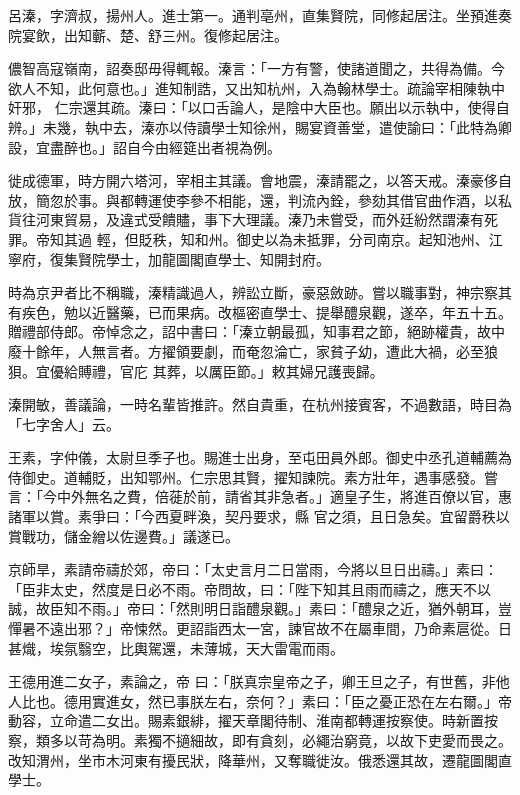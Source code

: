 \begin{pinyinscope}
 呂溱，字濟叔，揚州人。進士第一。通判亳州，直集賢院，同修起居注。坐預進奏院宴飲，出知蘄、楚、舒三州。復修起居注。



 儂智高寇嶺南，詔奏邸毋得輒報。溱言：「一方有警，使諸道聞之，共得為備。今欲人不知，此何意也。」進知制誥，又出知杭州，入為翰林學士。疏論宰相陳執中奸邪，
 仁宗還其疏。溱曰：「以口舌論人，是陰中大臣也。願出以示執中，使得自辨。」未幾，執中去，溱亦以侍讀學士知徐州，賜宴資善堂，遣使諭曰：「此特為卿設，宜盡醉也。」詔自今由經筵出者視為例。



 徙成德軍，時方開六塔河，宰相主其議。會地震，溱請罷之，以答天戒。溱豪侈自放，簡忽於事。與都轉運使李參不相能，還，判流內銓，參劾其借官曲作酒，以私貨往河東貿易，及違式受饋贐，事下大理議。溱乃未嘗受，而外廷紛然謂溱有死罪。帝知其過
 輕，但貶秩，知和州。御史以為未抵罪，分司南京。起知池州、江寧府，復集賢院學士，加龍圖閣直學士、知開封府。



 時為京尹者比不稱職，溱精識過人，辨訟立斷，豪惡斂跡。嘗以職事對，神宗察其有疾色，勉以近醫藥，已而果病。改樞密直學士、提舉醴泉觀，遂卒，年五十五。贈禮部侍郎。帝悼念之，詔中書曰：「溱立朝最孤，知事君之節，絕跡權貴，故中廢十餘年，人無言者。方擢領要劇，而奄忽淪亡，家貧子幼，遭此大禍，必至狼狽。宜優給賻禮，官庀
 其葬，以厲臣節。」敕其婦兄護喪歸。



 溱開敏，善議論，一時名輩皆推許。然自貴重，在杭州接賓客，不過數語，時目為「七字舍人」云。



 王素，字仲儀，太尉旦季子也。賜進士出身，至屯田員外郎。御史中丞孔道輔薦為侍御史。道輔貶，出知鄂州。仁宗思其賢，擢知諫院。素方壯年，遇事感發。嘗言：「今中外無名之費，倍蓰於前，請省其非急者。」適皇子生，將進百僚以官，惠諸軍以賞。素爭曰：「今西夏畔渙，契丹要求，縣
 官之須，且日急矣。宜留爵秩以賞戰功，儲金繒以佐邊費。」議遂已。



 京師旱，素請帝禱於郊，帝曰：「太史言月二日當雨，今將以旦日出禱。」素曰：「臣非太史，然度是日必不雨。帝問故，曰：「陛下知其且雨而禱之，應天不以誠，故臣知不雨。」帝曰：「然則明日詣醴泉觀。」素曰：「醴泉之近，猶外朝耳，豈憚暑不遠出邪？」帝悚然。更詔詣西太一宮，諫官故不在屬車間，乃命素扈從。日甚熾，埃氛翳空，比輿駕還，未薄城，天大雷電而雨。



 王德用進二女子，素論之，帝
 曰：「朕真宗皇帝之子，卿王旦之子，有世舊，非他人比也。德用實進女，然已事朕左右，奈何？」素曰：「臣之憂正恐在左右爾。」帝動容，立命遣二女出。賜素銀緋，擢天章閣待制、淮南都轉運按察使。時新置按察，類多以苛為明。素獨不擿細故，即有貪刻，必繩治窮竟，以故下吏愛而畏之。改知渭州，坐市木河東有擾民狀，降華州，又奪職徙汝。俄悉還其故，遷龍圖閣直學士。




\end{pinyinscope}
